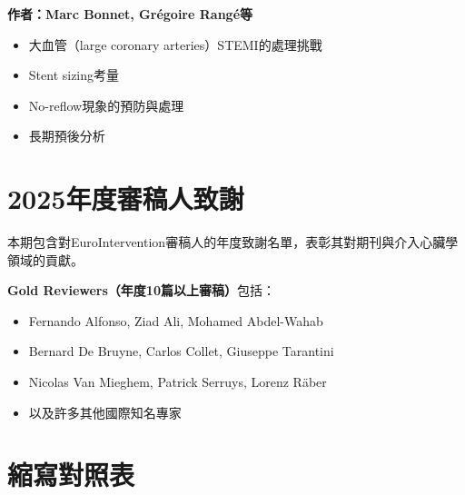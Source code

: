 \documentclass[12pt,a4paper]{article}
\begin{document}
\textbf{作者：Marc Bonnet, Grégoire Rangé等}

\begin{itemize}
    \item 大血管（large coronary arteries）STEMI的處理挑戰
    \item Stent sizing考量
    \item No-reflow現象的預防與處理
    \item 長期預後分析
\end{itemize}

\section{2025年度審稿人致謝}

本期包含對EuroIntervention審稿人的年度致謝名單，表彰其對期刊與介入心臟學領域的貢獻。

\textbf{Gold Reviewers（年度10篇以上審稿）}包括：
\begin{itemize}
    \item Fernando Alfonso, Ziad Ali, Mohamed Abdel-Wahab
    \item Bernard De Bruyne, Carlos Collet, Giuseppe Tarantini
    \item Nicolas Van Mieghem, Patrick Serruys, Lorenz Räber
    \item 以及許多其他國際知名專家
\end{itemize}

\section{縮寫對照表}
\end{document}
